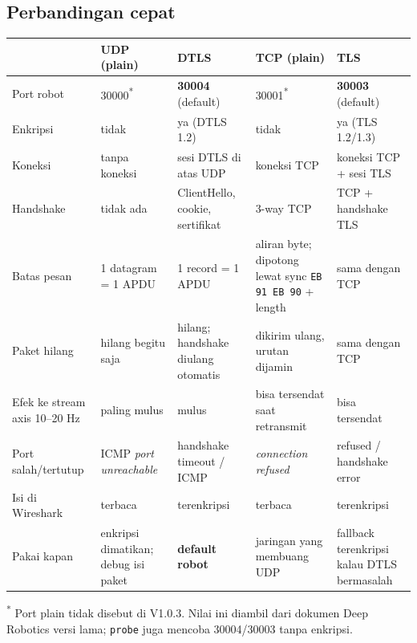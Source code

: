 \documentclass[11pt,a4paper]{article}
\newcommand{\code}[1]{\texttt{#1}}
\begin{document}
\subsection{Perbandingan cepat}
\begin{xltabular}{\linewidth}{@{}L{31mm}YYYY@{}}
\toprule
 & \textbf{UDP (plain)} & \textbf{DTLS} & \textbf{TCP (plain)} & \textbf{TLS}\\\midrule
\endhead
Port robot & 30000\textsuperscript{*} & \textbf{30004} (default) & 30001\textsuperscript{*} & \textbf{30003} (default)\\
Enkripsi & tidak & ya (DTLS 1.2) & tidak & ya (TLS 1.2/1.3)\\
Koneksi & tanpa koneksi & sesi DTLS di atas UDP & koneksi TCP & koneksi TCP + sesi TLS\\
Handshake & tidak ada & ClientHello, cookie, sertifikat & 3-way TCP & TCP + handshake TLS\\
Batas pesan & 1 datagram = 1 APDU & 1 record = 1 APDU & aliran byte; dipotong lewat sync \code{EB 91 EB 90} + length & sama dengan TCP\\
Paket hilang & hilang begitu saja & hilang; handshake diulang otomatis & dikirim ulang, urutan dijamin & sama dengan TCP\\
Efek ke stream axis 10--20 Hz & paling mulus & mulus & bisa tersendat saat retransmit & bisa tersendat\\
Port salah/tertutup & ICMP \emph{port unreachable} & handshake timeout / ICMP & \emph{connection refused} & refused / handshake error\\
Isi di Wireshark & terbaca & terenkripsi & terbaca & terenkripsi\\
Pakai kapan & enkripsi dimatikan; debug isi paket & \textbf{default robot} & jaringan yang membuang UDP & fallback terenkripsi kalau DTLS bermasalah\\
\bottomrule
\end{xltabular}
{\small\textsuperscript{*} Port plain tidak disebut di V1.0.3. Nilai ini diambil dari dokumen Deep Robotics versi lama; \code{probe}
juga mencoba 30004/30003 tanpa enkripsi.}
\end{document}
